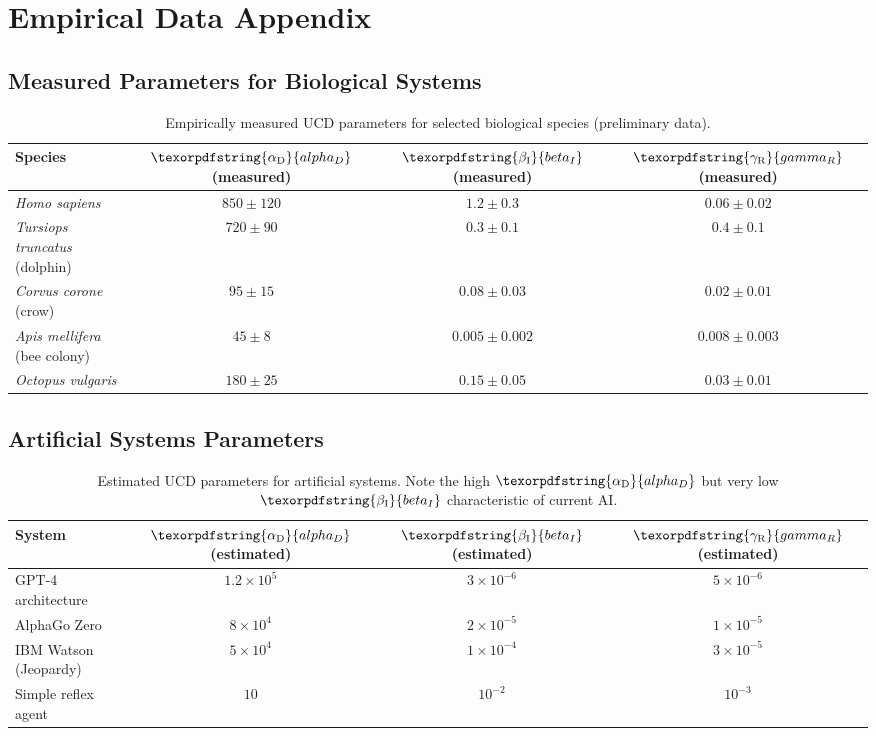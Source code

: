 \documentclass[12pt,a4paper]{article}
\DeclareRobustCommand{\alD}{\texorpdfstring{\ensuremath{\alpha_{\mathrm{D}}}}{alpha_D}}
\DeclareRobustCommand{\beI}{\texorpdfstring{\ensuremath{\beta_{\mathrm{I}}}}{beta_I}}
\DeclareRobustCommand{\gaR}{\texorpdfstring{\ensuremath{\gamma_{\mathrm{R}}}}{gamma_R}}
\begin{document}
	\section{Empirical Data Appendix}
	
	\subsection{Measured Parameters for Biological Systems}
	
	\begin{table}[ht]
		\centering
		\begin{tabular}{lccc}
			\toprule
			\textbf{Species} & \(\alD\) (measured) & \(\beI\) (measured) & \(\gaR\) (measured) \\
			\midrule
			\textit{Homo sapiens} & \(850 \pm 120\) & \(1.2 \pm 0.3\) & \(0.06 \pm 0.02\) \\
			\textit{Tursiops truncatus} (dolphin) & \(720 \pm 90\) & \(0.3 \pm 0.1\) & \(0.4 \pm 0.1\) \\
			\textit{Corvus corone} (crow) & \(95 \pm 15\) & \(0.08 \pm 0.03\) & \(0.02 \pm 0.01\) \\
			\textit{Apis mellifera} (bee colony) & \(45 \pm 8\) & \(0.005 \pm 0.002\) & \(0.008 \pm 0.003\) \\
			\textit{Octopus vulgaris} & \(180 \pm 25\) & \(0.15 \pm 0.05\) & \(0.03 \pm 0.01\) \\
			\bottomrule
		\end{tabular}
		\caption{Empirically measured UCD parameters for selected biological species (preliminary data).}
		\label{tab:bio-measurements}
	\end{table}
	
	\subsection{Artificial Systems Parameters}
	
	\begin{table}[ht]
		\centering
		\begin{tabular}{lccc}
			\toprule
			\textbf{System} & \(\alD\) (estimated) & \(\beI\) (estimated) & \(\gaR\) (estimated) \\
			\midrule
			GPT-4 architecture & \(1.2 \times 10^5\) & \(3 \times 10^{-6}\) & \(5 \times 10^{-6}\) \\
			AlphaGo Zero & \(8 \times 10^4\) & \(2 \times 10^{-5}\) & \(1 \times 10^{-5}\) \\
			IBM Watson (Jeopardy) & \(5 \times 10^4\) & \(1 \times 10^{-4}\) & \(3 \times 10^{-5}\) \\
			Simple reflex agent & \(10\) & \(10^{-2}\) & \(10^{-3}\) \\
			\bottomrule
		\end{tabular}
		\caption{Estimated UCD parameters for artificial systems. Note the high \(\alD\) but very low \(\beI\) characteristic of current AI.}
		\label{tab:ai-measurements}
	\end{table}
	
\end{document}
